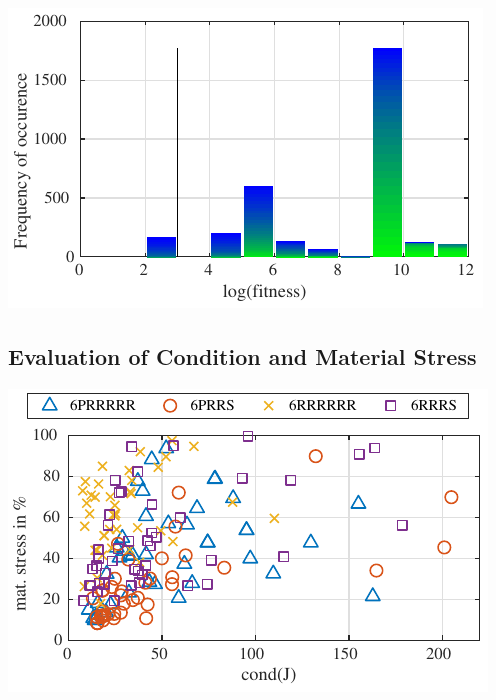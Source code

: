 \documentclass[fleqn,a4paper,10pt]{article}
\renewenvironment{figure}
  {\par\vspace{6pt}\noindent\minipage{\linewidth}}
  {\endminipage\par\vspace{6pt}}
\begin{document}
\begin{multicols}{2}
\begin{figure}
\centering
\includegraphics[align=t,smash=br,]{./Bilder/figure_histogram_fitness.pdf}

\label{fig:figure_histogram_fitness}
\end{figure}


\subsection{Evaluation of Condition and Material Stress}

\begin{figure}
    \centering
    \includegraphics{./Bilder/figure_matstress_vs_condition.pdf}
    \label{fig:eval_matstress_vs_condition}
\end{figure}




\end{multicols}
\end{document}
